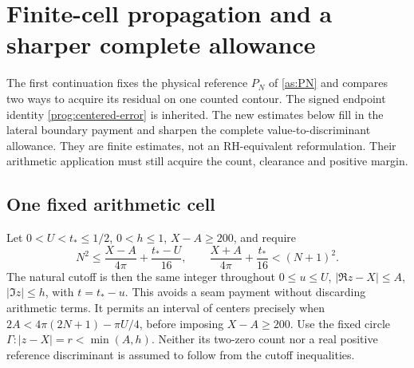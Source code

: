 \section{Finite-cell propagation and a sharper complete allowance}
\label{sec:local-estimates}

The first continuation fixes the physical reference $P_N$ of
\eqref{as:PN} and compares two ways to acquire its residual on one
counted contour. The signed endpoint identity \eqref{prog:centered-error}
is inherited. The new estimates below fill in the lateral boundary
payment and sharpen the complete value-to-discriminant allowance. They
are finite estimates, not an RH-equivalent reformulation. Their arithmetic
application must still acquire the count, clearance and positive margin.

\subsection{One fixed arithmetic cell}

Let $0<U<t_*\le1/2$, $0<h\le1$, $X-A\ge200$, and require
\begin{equation}
 N^2\le\frac{X-A}{4\pi}+\frac{t_*-U}{16},\qquad
 \frac{X+A}{4\pi}+\frac{t_*}{16}<(N+1)^2.
 \label{le:cutoff}
\end{equation}
The natural cutoff is then the same integer throughout
$0\le u\le U$, $|\Re z-X|\le A$, $|\Im z|\le h$, with
$t=t_*-u$. This avoids a seam payment without discarding arithmetic terms.
It permits an interval of centers precisely when
$2A<4\pi(2N+1)-\pi U/4$, before imposing $X-A\ge200$.
Use the fixed circle $\Gamma:|z-X|=r<\min(A,h)$.
Neither its two-zero count nor a real positive reference discriminant is
assumed to follow from the cutoff inequalities.

